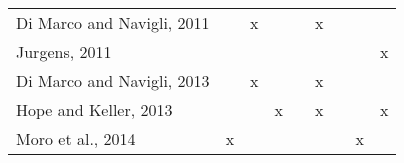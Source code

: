 \begin{table}[]
\begin{tabular}{l|cccc|cccc}
Di Marco and Navigli, 2011 \cite{2011.DiMarco.Navigli.ClusteringWebSearch}       &                                    & x                                 &                                     &                                         & x                                                                                &                                        &                                                 &                                                                                      \\
Jurgens, 2011 \cite{2011.Jurgens.WSICommunityDetection}                          &                                    &                                   &                                     &                                         &                                                                                  &                                        &                                                 & x                                                                                    \\
Di Marco and Navigli, 2013 \cite{2013.DiMarco.Navigli.ClusteringGraph-BasedWSI}  &                                    & x                                 &                                     &                                         & x                                                                                &                                        &                                                 &                                                                                      \\
Hope and Keller, 2013 \cite{2013.Hope.GradedWSI}                                 &                                    &                                   & x                                   &                                         & x                                                                                &                                        &                                                 & x                                                                                    \\
Moro et al., 2014 \cite{2014.Moro.Navigli.EntityLinking_WSD}                     & x                                  &                                   &                                     &                                         &                                                                                  &                                        & x                                               &                                                                                      \\

\end{tabular}
\end{table}
